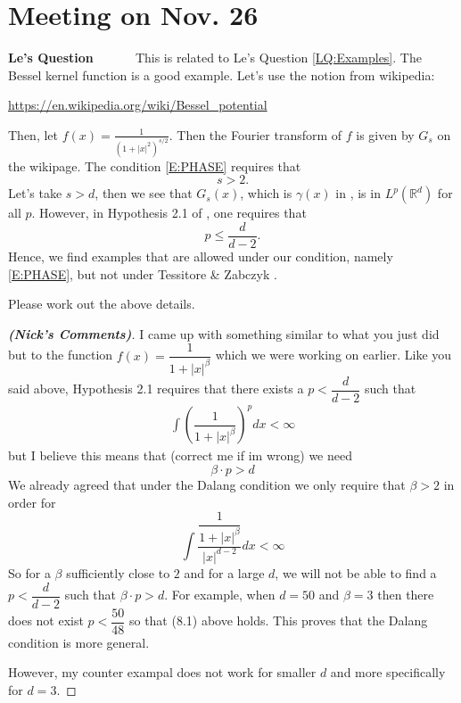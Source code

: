 \documentclass[a4paper,11pt]{article}
\theoremstyle{plain}
\theoremstyle{definition}
\newcommand{\R}{\mathbb{R}}
\newcounter{LQ}
\newenvironment{LeQuestion}[1][] %
  {\refstepcounter{LQ}
  \begin{mdframed}[backgroundcolor=red!10]\textbf{Le's Question \theLQ \: #1~~}~~~\noindent}%
  {\end{mdframed}}
\numberwithin{NQ}{section}
\numberwithin{LQ}{section}
\numberwithin{ZQ}{section}
\begin{document}
\section{Meeting on Nov. 26}

\begin{LeQuestion}\label{Q:Bessel}
This is related to Le's Question \ref{LQ:Examples}. The Bessel kernel function is a good example. Let's use the notion from wikipedia: 

\url{https://en.wikipedia.org/wiki/Bessel_potential}

Then, let $f(x)= \frac{1}{(1+|x|^2)^{s/2}}$. Then the Fourier transform of $f$ is given by $G_s$ on the wikipage. The condition \eqref{E:PHASE} requires that 
\[
s>2.
\]
Let's take $s>d$, then we see that $G_s(x)$, which is $\gamma(x)$ in \cite{TessitoreZabczyk98M}, is in $L^p(\R^d)$ for all $p$. However, in Hypothesis 2.1 of \cite{TessitoreZabczyk98M}, one requires that 
\[
p\le \frac{d}{d-2}.
\]
Hence, we find examples that are allowed under our condition, namely \eqref{E:PHASE}, but not under Tessitore \& Zabczyk \cite{TessitoreZabczyk98M}.
\bigskip

Please work out the above details.

\end{LeQuestion}
\begin{proof}[\textbf{(Nick's Comments)}] I came up with something similar to what you just did but to the function $f(x)=\dfrac{1}{1+|x|^\beta}$ which we were working on earlier. Like you said above, Hypothesis 2.1 requires that there exists a $p<\dfrac{d}{d-2}$ such that \begin{align} \int\left( \dfrac{1}{1+|x|^\beta}\right)^pdx < \infty \end{align} but I believe this means that (correct me if im wrong) we need $$\beta\cdot p >d$$
We already agreed that under the Dalang condition we only require that $\beta>2$ in order for $$ \int{ \dfrac{\dfrac{1}{1+|x|^\beta}}{|x|^{d-2}}dx} < \infty $$ So for a $\beta$ sufficiently close to $2$ and for a large $d$, we will not be able to find a $p<\dfrac{d}{d-2}$ such that $\beta\cdot p >d$. For example, when $d=50$ and $\beta =3$ then there does not exist $p<\dfrac{50}{48}$ so that (8.1) above holds. This proves that the Dalang condition is more general. 

However, my counter exampal does not work for smaller $d$ and more specifically for $d=3$. 


\end{proof}
\end{document}
